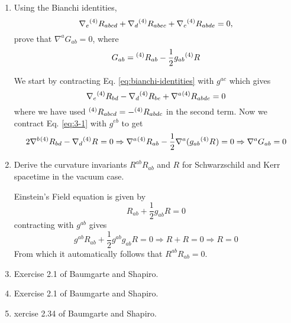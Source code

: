 \documentclass[10pt]{article}
\begin{document}
\begin{enumerate}
\item Using the Bianchi identities,
  \begin{equation}
    \label{eq:bianchi-identities}
    \nabla_e{}^{(4)}R_{abcd} + \nabla_d{}^{(4)}R_{abec} + \nabla_c{}^{(4)}R_{abde} = 0,
  \end{equation}
  prove that $\nabla^aG_{ab} = 0$, where
  \begin{equation}
    \label{eq:Gab}
    G_{ab} = {}^{(4)}R_{ab} - \frac{1}{2}g_{ab} {}^{(4)}R_{}
  \end{equation}

  We start by contracting Eq. \eqref{eq:bianchi-identities} with $g^{ac}$ which gives
  \begin{equation}
    \label{eq:3-1}
    \nabla_{e}{}^{(4)}R_{bd} - \nabla_d {}^{(4)}R_{be} + \nabla^a{}^{(4)}R_{abde} = 0
  \end{equation}
  where we have used ${}^{(4)}R_{abcd} = - {}^{(4)}R_{abdc}$ in the second term. Now we contract Eq. \eqref{eq:3-1} with $g^{eb}$ to get
  \begin{equation}
    \label{eq:}
    2 \nabla^b {}^{(4)}R_{bd} - \nabla_d {}^{(4)}R_{} = 0 \Rightarrow \nabla^a{}^{(4)}R_{ab} - \frac{1}{2} \nabla^a (g_{ab}{}^{(4)}R_{}) = 0 \Rightarrow \nabla^a G_{ab} = 0
  \end{equation}

\item Derive the curvature invariants $R^{ab}R_{ab}$ and $R$ for Schwarzschild and Kerr spacetime in the vacuum case.

  Einstein's Field equation is given by
  \begin{equation}
    \label{eq:EFE}
    R_{ab} + \frac{1}{2} g_{ab}R = 0
  \end{equation}
  contracting with $g^{ab}$ gives
  \begin{equation}
    \label{eq:}
    g^{ab}R_{ab} + \frac{1}{2} g^{ab}g_{ab}R = 0 \Rightarrow R + R = 0 \Rightarrow R = 0
  \end{equation}
  From which it automatically follows that $R^{ab}R_{ab} = 0$.

\item Exercise 2.1 of Baumgarte and Shapiro.
\item Exercise 2.1 of Baumgarte and Shapiro.
\item xercise 2.34 of Baumgarte and Shapiro.
\end{enumerate}
\end{document}
